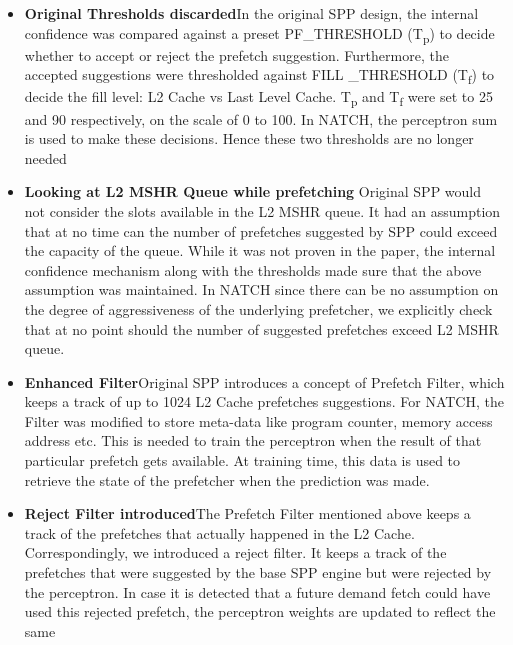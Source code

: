 \begin{itemize}
\item \textbf{Original Thresholds discarded}\newline In the original
  SPP design, the internal confidence was
  compared against a preset PF\_THRESHOLD (T\textsubscript{p}) to
  decide whether to accept or reject the prefetch suggestion.
  Furthermore, the accepted suggestions were thresholded against FILL
  \_THRESHOLD (T\textsubscript{f}) to decide the fill level: L2 Cache
  vs Last Level Cache.  T\textsubscript{p} and T\textsubscript{f} were
  set to 25 and 90 respectively, on the scale of 0 to 100.  In
  NATCH, the perceptron sum is used to make these decisions.  Hence
  these two thresholds are no longer needed

\item \textbf{Looking at L2 MSHR Queue while prefetching}\newline
  Original SPP would not consider the slots available in the L2 MSHR
  queue.  It had an assumption that at no time can the number of
  prefetches suggested by SPP could exceed the capacity of the queue.
  While it was not proven in the paper, the internal confidence
  mechanism along with the thresholds made sure that the above
  assumption was maintained.  In NATCH since there can be no
  assumption on the degree of aggressiveness of the underlying prefetcher, 
  we explicitly check that at no point
  should the number of suggested prefetches exceed L2 MSHR queue.

\item \textbf{Enhanced Filter}\newline Original SPP introduces a
  concept of Prefetch Filter, which keeps a track of up to 1024 L2
  Cache prefetches suggestions.  For NATCH, the Filter was modified to store
  meta-data like program counter, memory access address etc.  This is
  needed to train the perceptron when the result of that particular
  prefetch gets available.  At training time, this data is used to
  retrieve the state of the prefetcher when the prediction was made.

\item \textbf{Reject Filter introduced}\newline The Prefetch Filter
  mentioned above keeps a track of the prefetches that actually
  happened in the L2 Cache.  Correspondingly, we introduced a reject
  filter.  It keeps a track of the prefetches that were suggested by
  the base SPP engine but were rejected by the perceptron.  In case it
  is detected that a future demand fetch could have used this rejected
  prefetch, the perceptron weights are updated to reflect the same

\end{itemize}

